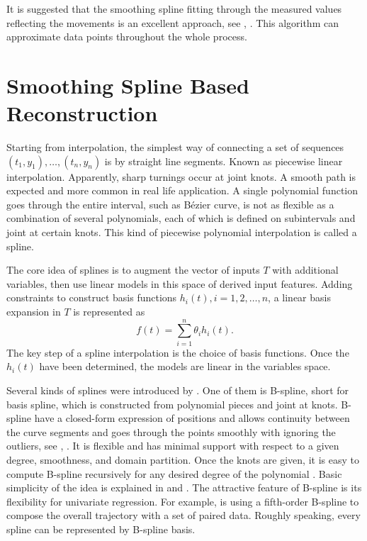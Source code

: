 It is suggested that the smoothing spline fitting through the measured values reflecting the movements is an excellent approach, see \cite{eubank2004simple}, \cite{durbin2012time}. This algorithm can approximate data points throughout the whole process. 


\section{Smoothing Spline Based Reconstruction}


Starting from interpolation, the simplest way of connecting a set of sequences $(t_1,y_1),\ldots, (t_n,y_n)$ is by straight line segments. Known as piecewise linear interpolation. Apparently, sharp turnings occur at joint knots. A smooth path is expected and more common in real life application. A single polynomial function goes through the entire interval, such as B\'ezier curve, is not as flexible as a combination of several polynomials, each of which is defined on subintervals and joint at certain knots. This kind of piecewise polynomial interpolation is called a spline. 

The core idea of splines is to augment the vector of inputs $T$ with additional variables, then use linear models in this space of derived input features. Adding constraints to construct basis functions $h_i(t), i = 1, 2,\ldots, n$, a linear basis expansion in $T$ is represented as
\begin{equation*}
f(t)=\sum_{i=1}^n \theta_i h_i(t).
\end{equation*}
The key step of a spline interpolation is the choice of basis functions. Once the $h_i(t)$ have been determined, the models are linear in the variables space. 

Several kinds of splines were introduced by \cite{esl2009}. One of them is B-spline, short for basis spline, which is constructed from polynomial pieces and joint at knots. B-spline have a closed-form expression of positions and allows continuity between the curve segments and goes through the points smoothly with ignoring the outliers, see \eg \cite{komoriya1989trajectory}, \cite{ben2004geometric}. It is flexible and has minimal support with respect to a given degree, smoothness, and domain partition. Once the knots are given, it is easy to compute B-spline recursively for any desired degree of the polynomial \cite{de1978practical} \cite{cox1982practical}. Basic simplicity of the idea is explained in \cite{dierckx1995curve} and \cite{eilers1996flexible}. The attractive feature of B-spline is its flexibility for univariate regression. For example,  \cite{gasparetto2007new} is using a fifth-order B-spline to compose the overall trajectory with a set of paired data. Roughly speaking, every spline can be represented by B-spline basis. 

